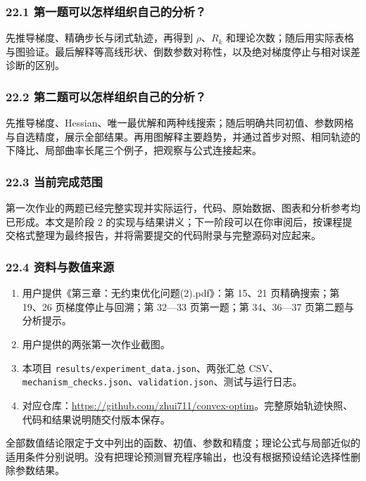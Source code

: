 \documentclass[10pt,a4paper]{article}
\providecommand{\tightlist}{\setlength{\itemsep}{2pt}\setlength{\parskip}{2pt}}
\begin{document}
\subsubsection{22.1
第一题可以怎样组织自己的分析？}\label{ux7b2cux4e00ux9898ux53efux4ee5ux600eux6837ux7ec4ux7ec7ux81eaux5df1ux7684ux5206ux6790}

先推导梯度、精确步长与闭式轨迹，再得到 \(\rho\)、\(R_k\)
和理论次数；随后用实际表格与图验证。最后解释等高线形状、倒数参数对称性，以及绝对梯度停止与相对误差诊断的区别。

\subsubsection{22.2
第二题可以怎样组织自己的分析？}\label{ux7b2cux4e8cux9898ux53efux4ee5ux600eux6837ux7ec4ux7ec7ux81eaux5df1ux7684ux5206ux6790}

先推导梯度、Hessian、唯一最优解和两种线搜索；随后明确共同初值、参数网格与自选精度，展示全部结果。再用图解释主要趋势，并通过首步对照、相同轨迹的下降比、局部曲率长尾三个例子，把观察与公式连接起来。

\subsubsection{22.3
当前完成范围}\label{ux5f53ux524dux5b8cux6210ux8303ux56f4}

第一次作业的两题已经完整实现并实际运行，代码、原始数据、图表和分析参考均已形成。本文是阶段
2
的实现与结果讲义；下一阶段可以在你审阅后，按课程提交格式整理为最终报告，并将需要提交的代码附录与完整源码对应起来。

\subsubsection{22.4
资料与数值来源}\label{ux8d44ux6599ux4e0eux6570ux503cux6765ux6e90}

\begin{enumerate}
\def\labelenumi{\arabic{enumi}.}
\tightlist
\item
  用户提供《第三章：无约束优化问题(2).pdf》：第 15、21 页精确搜索；第
  19、26 页梯度停止与回溯；第 32---33 页第一题；第 34、36---37
  页第二题与分析提示。
\item
  用户提供的两张第一次作业截图。
\item
  本项目 \texttt{results/experiment\_data.json}、两张汇总
  CSV、\texttt{mechanism\_checks.json}、\texttt{validation.json}、测试与运行日志。
\item
  对应仓库：\url{https://github.com/zhui711/convex-optim}。完整原始轨迹快照、代码和结果说明随交付版本保存。
\end{enumerate}

全部数值结论限定于文中列出的函数、初值、参数和精度；理论公式与局部近似的适用条件分别说明。没有把理论预测冒充程序输出，也没有根据预设结论选择性删除参数结果。

\label{LastPage}
\end{document}
